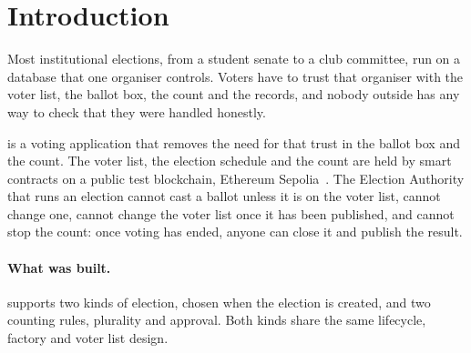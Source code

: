 \section{Introduction}

Most institutional elections, from a student senate to a club committee, run on
a database that one organiser controls. Voters have to trust that organiser
with the voter list, the ballot box, the count and the records, and nobody
outside has any way to check that they were handled honestly.

\projectname{} is a voting application that removes the need for that trust in
the ballot box and the count. The voter list, the election schedule and the
count are held by smart contracts on a public test blockchain, Ethereum
Sepolia~\cite{sepolia}. The Election Authority that runs an election cannot cast
a ballot unless it is on the voter list, cannot change one, cannot change the
voter list once it has been published,
and cannot stop the count: once voting has ended, anyone can close it and
publish the result.

\paragraph{What was built.}
\projectname{} supports two kinds of election, chosen when the election is
created, and two counting rules, plurality and approval. Both kinds share the
same lifecycle, factory and voter list design.

